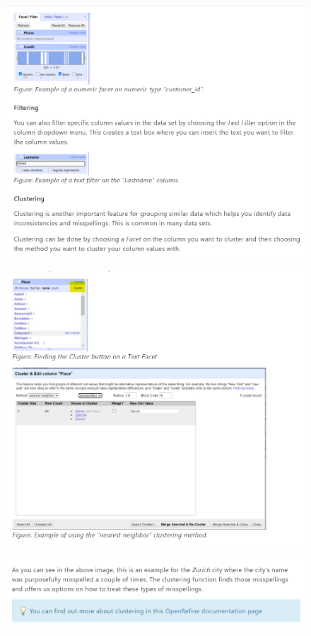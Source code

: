 \begin{figure}[H]
    \includegraphics[width=\linewidth]{./Figures/Appendices/worksheet/12.png}
\end{figure}
\begin{figure}[H]
    \includegraphics[width=\linewidth]{./Figures/Appendices/worksheet/13.png}
\end{figure}
\begin{figure}[H]
    \includegraphics[width=\linewidth]{./Figures/Appendices/worksheet/14.png}
\end{figure}
